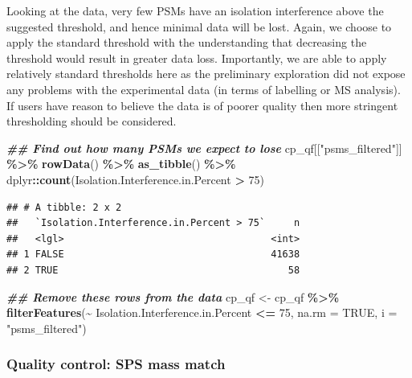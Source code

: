\documentclass[9pt,a4paper,]{extarticle}
\newenvironment{Shaded}{\begin{snugshade}}{\end{snugshade}}
\newcommand{\AttributeTok}[1]{\textcolor[rgb]{0.13,0.29,0.53}{#1}}
\newcommand{\ConstantTok}[1]{\textcolor[rgb]{0.56,0.35,0.01}{#1}}
\newcommand{\DecValTok}[1]{\textcolor[rgb]{0.00,0.00,0.81}{#1}}
\newcommand{\DocumentationTok}[1]{\textcolor[rgb]{0.56,0.35,0.01}{\textbf{\textit{#1}}}}
\newcommand{\FunctionTok}[1]{\textcolor[rgb]{0.13,0.29,0.53}{\textbf{#1}}}
\newcommand{\NormalTok}[1]{#1}
\newcommand{\OtherTok}[1]{\textcolor[rgb]{0.56,0.35,0.01}{#1}}
\newcommand{\SpecialCharTok}[1]{\textcolor[rgb]{0.81,0.36,0.00}{\textbf{#1}}}
\newcommand{\StringTok}[1]{\textcolor[rgb]{0.31,0.60,0.02}{#1}}
\begin{document}
Looking at the data, very few PSMs have an isolation interference above the
suggested threshold, and hence minimal data will be lost. Again, we choose to
apply the standard threshold with the understanding that decreasing the
threshold would result in greater data loss. Importantly, we are able to apply
relatively standard thresholds here as the preliminary exploration did not
expose any problems with the experimental data (in terms of labelling or MS
analysis). If users have reason to believe the data is of poorer quality then
more stringent thresholding should be considered.

\begin{Shaded}
\begin{Highlighting}[]
\DocumentationTok{\#\# Find out how many PSMs we expect to lose}
\NormalTok{cp\_qf[[}\StringTok{"psms\_filtered"}\NormalTok{]] }\SpecialCharTok{\%\textgreater{}\%} 
  \FunctionTok{rowData}\NormalTok{() }\SpecialCharTok{\%\textgreater{}\%} 
  \FunctionTok{as\_tibble}\NormalTok{() }\SpecialCharTok{\%\textgreater{}\%} 
\NormalTok{  dplyr}\SpecialCharTok{::}\FunctionTok{count}\NormalTok{(Isolation.Interference.in.Percent }\SpecialCharTok{\textgreater{}} \DecValTok{75}\NormalTok{)}
\end{Highlighting}
\end{Shaded}

\begin{verbatim}
## # A tibble: 2 x 2
##   `Isolation.Interference.in.Percent > 75`     n
##   <lgl>                                    <int>
## 1 FALSE                                    41638
## 2 TRUE                                        58
\end{verbatim}

\begin{Shaded}
\begin{Highlighting}[]
\DocumentationTok{\#\# Remove these rows from the data}
\NormalTok{cp\_qf }\OtherTok{\textless{}{-}}\NormalTok{ cp\_qf }\SpecialCharTok{\%\textgreater{}\%}
  \FunctionTok{filterFeatures}\NormalTok{(}\SpecialCharTok{\textasciitilde{}}\NormalTok{ Isolation.Interference.in.Percent }\SpecialCharTok{\textless{}=} \DecValTok{75}\NormalTok{, }
                 \AttributeTok{na.rm =} \ConstantTok{TRUE}\NormalTok{,}
                 \AttributeTok{i =} \StringTok{"psms\_filtered"}\NormalTok{)}
\end{Highlighting}
\end{Shaded}

\subsubsection{Quality control: SPS mass match}\label{quality-control-sps-mass-match}
\end{document}
